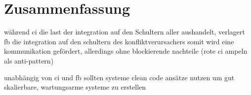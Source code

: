 \chapter{Zusammenfassung}

während ci die last der integration auf den Schultern aller aushandelt, verlagert fb die integration auf den schultern des \glqq konfliktverursachers\grqq{} somit wird eine kommunikation gefördert, allerdings ohne blockierende nachteile (rote ci ampeln als anti-pattern)

unabhängig von ci und fb sollten systeme clean code ansätze nutzen um gut skalierbare, wartungsarme systeme zu erstellen